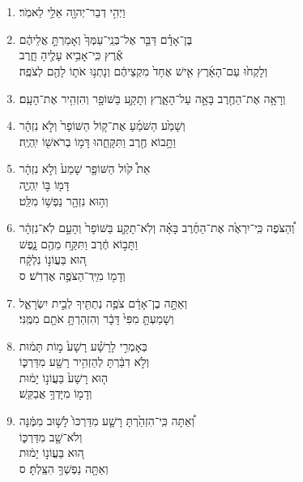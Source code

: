 \documentclass[12pt,a4paper,titlepage]{article}
\def \pslabelsep{-0.9em} %
\def \psleftmargin{0em} %
\begin{document}
\noindent
\section*{}
\begin{enumerate}[leftmargin=\psleftmargin, labelsep = \pslabelsep, label={\arabic*}, font=\color{\pscolor}\small\textsuperscript, parsep=0em, itemsep=0em, topsep=0em ]
\item \texthebrew{וַיְהִ֥י דְבַר־יְהוָ֖ה אֵלַ֥י לֵאמֹֽר׃}
\item \texthebrew{בֶּן־אָדָ֗ם דַּבֵּ֤ר אֶל־בְּנֵֽי־עַמְּךָ֙ וְאָמַרְתָּ֣ אֲלֵיהֶ֔ם \\ אֶ֕רֶץ כִּֽי־אָבִ֥יא עָלֶ֖יהָ חָ֑רֶב \\ וְלָקְח֙וּ עַם־הָאָ֜רֶץ אִ֤ישׁ אֶחָד֙ מִקְצֵיהֶ֔ם וְנָתְנ֥וּ אֹת֛וֹ לָהֶ֖ם לְצֹפֶֽה׃} 
\item \texthebrew{וְרָאָ֥ה אֶת־הַחֶ֖רֶב בָּאָ֣ה עַל־הָאָ֑רֶץ וְתָקַ֥ע בַּשּׁוֹפָ֖ר וְהִזְהִ֥יר אֶת־הָעָֽם׃}
\item \texthebrew{וְשָׁמַ֙ע הַשֹּׁמֵ֜עַ אֶת־ק֤וֹל הַשּׁוֹפָר֙ וְלֹ֣א נִזְהָ֔ר \\ וַתָּ֥בוֹא חֶ֖רֶב וַתִּקָּחֵ֑הוּ דָּמ֥וֹ בְרֹאשׁ֖וֹ יִֽהְיֶֽה׃}
\item \texthebrew{אֵת֩ ק֙וֹל הַשּׁוֹפָ֤ר שָׁמַע֙ וְלֹ֣א נִזְהָ֔ר \\ דָּמ֖וֹ בּ֣וֹ יִֽהְיֶ֑ה \\ וְה֥וּא נִזְהָ֖ר נַפְשׁ֥וֹ מִלֵּֽט׃}
\item \texthebrew{וְ֠הַצֹּפֶה כִּֽי־יִרְאֶ֙ה אֶת־הַחֶ֜רֶב בָּאָ֗ה וְלֹֽא־תָקַ֤ע בַּשּׁוֹפָר֙ וְהָעָ֣ם לֹֽא־נִזְהָ֔ר \\ וַתָּב֣וֹא חֶ֔רֶב וַתִּקַּ֥ח מֵהֶ֖ם נָ֑פֶשׁ \\ ה֚וּא בַּעֲוֹנ֣וֹ נִלְקָ֔ח \\ וְדָמ֖וֹ מִיַּֽד־הַצֹּפֶ֥ה אֶדְרֹֽשׁ׃ ס}\parSpace
\item \texthebrew{וְאַתָּ֣ה בֶן־אָדָ֔ם צֹפֶ֥ה נְתַתִּ֖יךָ לְבֵ֣ית יִשְׂרָאֵ֑ל \\ וְשָׁמַעְתָּ֤ מִפִּי֙ דָּבָ֔ר וְהִזְהַרְתָּ֥ אֹתָ֖ם מִמֶּֽנִּי׃}
\item \texthebrew{בְּאָמְרִ֣י לָרָשָׁ֗ע רָשָׁע֙ מ֣וֹת תָּמ֔וּת \\ וְלֹ֣א דִבַּ֔רְתָּ לְהַזְהִ֥יר רָשָׁ֖ע מִדַּרְכּ֑וֹ \\ ה֤וּא רָשָׁע֙ בַּעֲוֹנ֣וֹ יָמ֔וּת \\ וְדָמ֖וֹ מִיָּדְךָ֥ אֲבַקֵּֽשׁ׃}
\item \texthebrew{וְ֠אַתָּה כִּֽי־הִזְהַ֙רְתָּ רָשָׁ֤ע מִדַּרְכּוֹ֙ לָשׁ֣וּב מִמֶּ֔נָּה \\ וְלֹא־שָׁ֖ב מִדַּרְכּ֑וֹ \\ ה֚וּא בַּעֲוֹנ֣וֹ יָמ֔וּת \\ וְאַתָּ֖ה נַפְשְׁךָ֥ הִצַּֽלְתָּ׃ ס}\parSpace

\end{enumerate}
\end{document}
